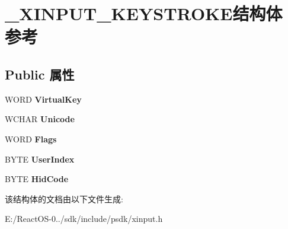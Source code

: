 \hypertarget{struct___x_i_n_p_u_t___k_e_y_s_t_r_o_k_e}{}\section{\+\_\+\+X\+I\+N\+P\+U\+T\+\_\+\+K\+E\+Y\+S\+T\+R\+O\+K\+E结构体 参考}
\label{struct___x_i_n_p_u_t___k_e_y_s_t_r_o_k_e}
\subsection*{Public 属性}
\begin{DoxyCompactItemize}
\item 
\mbox{\label{struct___x_i_n_p_u_t___k_e_y_s_t_r_o_k_e_ab47bde7950a6d99b87f8cfe896b60c82}} 
W\+O\+RD {\bfseries Virtual\+Key}
\item 
\mbox{\label{struct___x_i_n_p_u_t___k_e_y_s_t_r_o_k_e_aaa16bd0ba9849fc4be79f3d5ebc01e25}} 
W\+C\+H\+AR {\bfseries Unicode}
\item 
\mbox{\label{struct___x_i_n_p_u_t___k_e_y_s_t_r_o_k_e_a3bd348da2bd2ce5d16f70b9ae5cbcd7b}} 
W\+O\+RD {\bfseries Flags}
\item 
\mbox{\label{struct___x_i_n_p_u_t___k_e_y_s_t_r_o_k_e_ae749b05e8fa58ef8699ad857f631f161}} 
B\+Y\+TE {\bfseries User\+Index}
\item 
\mbox{\label{struct___x_i_n_p_u_t___k_e_y_s_t_r_o_k_e_a432d7fc2814d61ae3d210eb1254c4589}} 
B\+Y\+TE {\bfseries Hid\+Code}
\end{DoxyCompactItemize}


该结构体的文档由以下文件生成\+:\begin{DoxyCompactItemize}
\item 
E\+:/\+React\+O\+S-\/0../sdk/include/psdk/xinput.\+h\end{DoxyCompactItemize}
